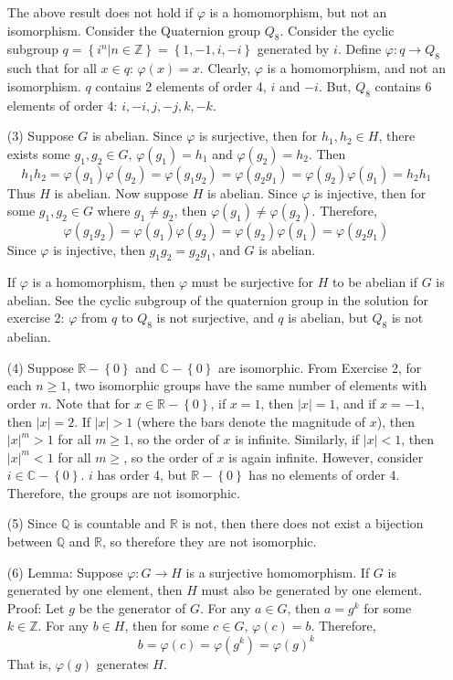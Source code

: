 \documentclass[12pt]{article}
\begin{document}
\begin{itemize}
The above result does not hold if $\varphi$ is a homomorphism, but not an isomorphism. Consider the Quaternion group $Q_8$. Consider the cyclic subgroup $q = \left\lbrace i^n | n \in \mathbb{Z} \right\rbrace = \left\lbrace 1, -1, i, -i \right\rbrace$ generated by $i$. Define $\varphi: q \rightarrow Q_8$ such that for all $x \in q$: $\varphi(x) = x$. Clearly, $\varphi$ is a homomorphism, and not an isomorphism. $q$ contains 2 elements of order 4, $i$ and $-i$. But, $Q_8$ contains 6 elements of order 4: $i, -i, j, -j, k, -k$.
\item[(3)]
Suppose $G$ is abelian. Since $\varphi$ is surjective, then for $h_1, h_2 \in H$, there exists some $g_1, g_2 \in G$, $\varphi(g_1) = h_1$ and $\varphi(g_2) = h_2$. Then
$$h_1h_2 = \varphi(g_1)\varphi(g_2) = \varphi(g_1g_2) = \varphi(g_2g_1) = \varphi(g_2)\varphi(g_1) = h_2h_1$$
Thus $H$ is abelian. Now suppose $H$ is abelian. Since $\varphi$ is injective, then for some $g_1, g_2 \in G$ where $g_1 \neq g_2$, then $\varphi(g_1) \neq \varphi(g_2)$. Therefore,
$$\varphi(g_1g_2) = \varphi(g_1)\varphi(g_2) = \varphi(g_2)\varphi(g_1) = \varphi(g_2g_1)$$
Since $\varphi$ is injective, then $g_1g_2 = g_2g_1$, and $G$ is abelian.

If $\varphi$ is a homomorphism, then $\varphi$ must be surjective for $H$ to be abelian if $G$ is abelian. See the cyclic subgroup of the quaternion group in the solution for exercise 2: $\varphi$ from $q$ to $Q_8$ is not surjective, and $q$ is abelian, but $Q_8$ is not abelian.
\item[(4)]
Suppose $\mathbb{R} - \left\lbrace 0 \right\rbrace$ and $\mathbb{C} - \left\lbrace 0 \right\rbrace$ are isomorphic. From Exercise 2, for each $n \geq 1$, two isomorphic groups have the same number of elements with order $n$. Note that for $x \in \mathbb{R} - \left\lbrace 0 \right\rbrace$, if $x = 1$, then $|x| = 1$, and if $x = -1$, then $|x| = 2$. If $|x| > 1$ (where the bars denote the magnitude of $x$), then $|x|^m > 1$ for all $m \geq 1$, so the order of $x$ is infinite. Similarly, if $|x| < 1$, then $|x|^m < 1$ for all $m \geq $, so the order of $x$ is again infinite. However, consider $i \in \mathbb{C} - \left\lbrace 0 \right\rbrace$. $i$ has order 4, but $\mathbb{R} - \left\lbrace 0 \right\rbrace$ has no elements of order 4. Therefore, the groups are not isomorphic.
\item[(5)]
Since $\mathbb{Q}$ is countable and $\mathbb{R}$ is not, then there does not exist a bijection between $\mathbb{Q}$ and $\mathbb{R}$, so therefore they are not isomorphic.
\item[(6)]
Lemma: Suppose $\varphi: G \rightarrow H$ is a surjective homomorphism. If $G$ is generated by one element, then $H$ must also be generated by one element. Proof: Let $g$ be the generator of $G$. For any $a \in G$, then $a = g^k$ for some $k \in \mathbb{Z}$. For any $b \in H$, then for some $c \in G$, $\varphi(c) = b$. Therefore,
$$b = \varphi(c) = \varphi(g^k) = \varphi(g)^k$$
That is, $\varphi(g)$ generates $H$.


\end{itemize}
\end{document}
